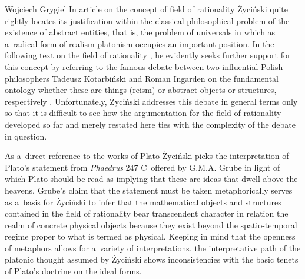 \begin{artengenv}{Wojciech Grygiel}
In article
\parencite[][]{zycinski_poza_1991} %
 on the concept of field of rationality Życiński quite rightly locates its justification within the classical philosophical problem of the existence of abstract entities, that is, the problem of universals in which as a~radical form of realism platonism occupies an important position. In the following text on the field of rationality 
\parencite[][]{zycinski_status_1995}, %
 he evidently seeks further support for this concept by referring to the famous debate between two influential Polish philosophers Tadeusz Kotarbiński and Roman Ingarden on the fundamental ontology whether these are things (reism) or abstract objects or structures, respectively 
\parencites[][]{kotarbinski_sprawa_1920}[][pp.483–507]{ingarden_z_1972}. %
 Unfortunately, Życiński addresses this debate in general terms only so that it is difficult to see how the argumentation for the field of rationality developed so far and merely restated here ties with the complexity of the debate in question.

As a~direct reference to the works of Plato Życiński picks the interpretation of Plato's statement from \textit{Phaedrus} 247 C~offered by G.M.A. Grube in light of which Plato should be read as implying that these are ideas that dwell above the heavens. Grube's claim
\parencite*[][pp.30–35]{grube_platos_1958} %
 that the statement must be taken metaphorically serves as a~basis for Życiński to infer that the mathematical objects and structures contained in the field of rationality bear transcendent character in relation the realm of concrete physical objects because they exist beyond the spatio-temporal regime proper to what is termed as physical. Keeping in mind that the openness of metaphors allows for a~variety of interpretations, the interpretative path of the platonic thought assumed by Życiński shows inconsistencies with the basic tenets of Plato's doctrine on the ideal forms.


\end{artengenv}
